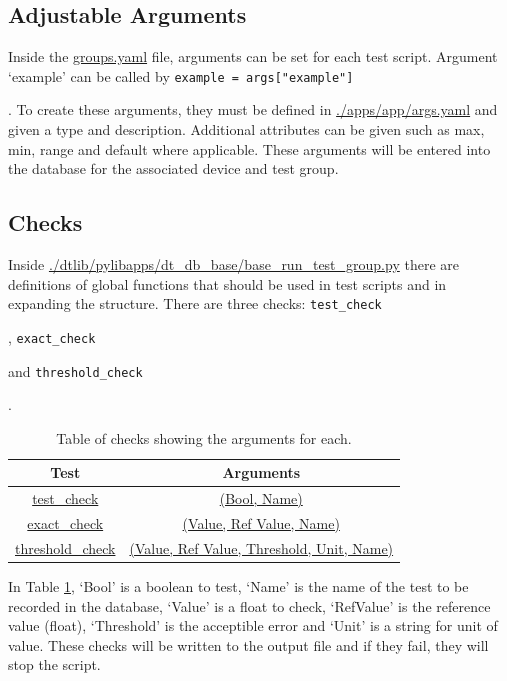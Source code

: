 \documentclass[a4paper,12pt, notitlepage]{article}
\begin{document}
\subsection{Adjustable Arguments}
\label{ssec: globalsArgs}

Inside the \url{groups.yaml} file, arguments can be set for each test script. Argument `example' can be called by \lstinline{example = args["example"]}{. To create these arguments, they must be defined in \url{./apps/app/args.yaml} and given a type and description. Additional attributes can be given such as max, min, range and default where applicable. These arguments will be entered into the database for the associated device and test group. 

\subsection{Checks}
\label{ssec: globalsChecks}

Inside \url{./dtlib/pylibapps/dt_db_base/base_run_test_group.py} there are definitions of global functions that should be used in test scripts and in expanding the structure. There are three checks: \lstinline{test_check}{, \lstinline{exact_check}{ and \lstinline{threshold_check}{.

\begin{table}[h]
	\centering
	\begin{tabular}{ c c }
		\hline 
		Test & Arguments \\ %
		\hline 
		\url{test_check} & \url{(Bool, Name)} \\ %
		\url{exact_check}  & \url{(Value, Ref Value, Name)} \\ %
		\url{threshold_check} & \url{(Value, Ref Value, Threshold, Unit, Name)} \\ %
		\hline 
	\end{tabular}
	\caption{Table of checks showing the arguments for each.}
	\label{tab: checks}
\end{table}

In Table \ref{tab: checks}, `Bool' is a boolean to test, `Name' is the name of the test to be recorded in the database, `Value' is a float to check, `RefValue' is the reference value (float), `Threshold' is the acceptible error and `Unit' is a string for unit of value. These checks will be written to the output file and if they fail, they will stop the script.

}}}}
\end{document}
